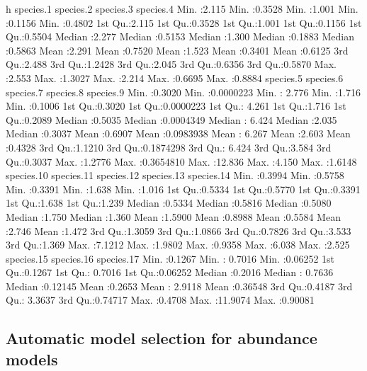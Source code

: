 \documentclass[article]{jss}
\begin{document}
\begin{CodeChunk}
\begin{CodeOutput}
       h           species.1        species.2       species.3        species.4     
 Min.   :2.115   Min.   :0.3528   Min.   :1.001   Min.   :0.1156   Min.   :0.4802  
 1st Qu.:2.115   1st Qu.:0.3528   1st Qu.:1.001   1st Qu.:0.1156   1st Qu.:0.5504  
 Median :2.277   Median :0.5153   Median :1.300   Median :0.1883   Median :0.5863  
 Mean   :2.291   Mean   :0.7520   Mean   :1.523   Mean   :0.3401   Mean   :0.6125  
 3rd Qu.:2.488   3rd Qu.:1.2428   3rd Qu.:2.045   3rd Qu.:0.6356   3rd Qu.:0.5870  
 Max.   :2.553   Max.   :1.3027   Max.   :2.214   Max.   :0.6695   Max.   :0.8884  
   species.5        species.6           species.7        species.8       species.9     
 Min.   :0.3020   Min.   :0.0000223   Min.   : 2.776   Min.   :1.716   Min.   :0.1006  
 1st Qu.:0.3020   1st Qu.:0.0000223   1st Qu.: 4.261   1st Qu.:1.716   1st Qu.:0.2089  
 Median :0.5035   Median :0.0004349   Median : 6.424   Median :2.035   Median :0.3037  
 Mean   :0.6907   Mean   :0.0983938   Mean   : 6.267   Mean   :2.603   Mean   :0.4328  
 3rd Qu.:1.1210   3rd Qu.:0.1874298   3rd Qu.: 6.424   3rd Qu.:3.584   3rd Qu.:0.3037  
 Max.   :1.2776   Max.   :0.3654810   Max.   :12.836   Max.   :4.150   Max.   :1.6148  
   species.10       species.11       species.12       species.13      species.14   
 Min.   :0.3994   Min.   :0.5758   Min.   :0.3391   Min.   :1.638   Min.   :1.016  
 1st Qu.:0.5334   1st Qu.:0.5770   1st Qu.:0.3391   1st Qu.:1.638   1st Qu.:1.239  
 Median :0.5334   Median :0.5816   Median :0.5080   Median :1.750   Median :1.360  
 Mean   :1.5900   Mean   :0.8988   Mean   :0.5584   Mean   :2.746   Mean   :1.472  
 3rd Qu.:1.3059   3rd Qu.:1.0866   3rd Qu.:0.7826   3rd Qu.:3.533   3rd Qu.:1.369  
 Max.   :7.1212   Max.   :1.9802   Max.   :0.9358   Max.   :6.038   Max.   :2.525  
   species.15       species.16        species.17     
 Min.   :0.1267   Min.   : 0.7016   Min.   :0.06252  
 1st Qu.:0.1267   1st Qu.: 0.7016   1st Qu.:0.06252  
 Median :0.2016   Median : 0.7636   Median :0.12145  
 Mean   :0.2653   Mean   : 2.9118   Mean   :0.36548  
 3rd Qu.:0.4187   3rd Qu.: 3.3637   3rd Qu.:0.74717  
 Max.   :0.4708   Max.   :11.9074   Max.   :0.90081  
\end{CodeOutput}
\end{CodeChunk}

\subsection{Automatic model selection for abundance
models}\label{automatic-model-selection-for-abundance-models}
\end{document}
